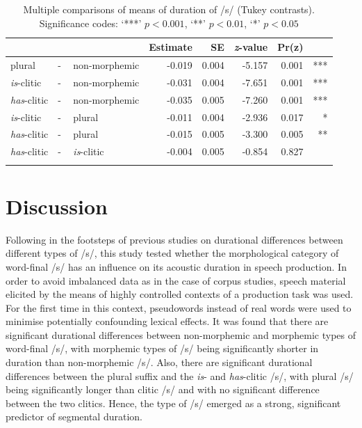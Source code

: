 \begin{table}\fontsize{10}{11}
\caption{Multiple comparisons of means of duration of /s/ (Tukey contrasts). Significance codes: `***' $p < 0.001$, `**' $p < 0.01$, `*' $p < 0.05$}
\label{tab:4.11}
\centering
\begin{tabular}{lllrrrrr} 
\lsptoprule
~                   & ~ & ~                  & Estimate & SE    & \textit{z}-value & Pr(\textbar{}z\textbar{}) & ~    \\ 
\midrule
plural              & - & non-morphemic      & -0.019   & 0.004 & -5.157           & 
  0.001                  & ***  \\
\textit{is}-clitic  & - & non-morphemic      & -0.031   & 0.004 & -7.651           &  0.001                    & ***  \\
\textit{has}-clitic & - & non-morphemic      & -0.035   & 0.005 & -7.260           & 
  0.001                  & ***  \\
\textit{is}-clitic  & - & plural             & -0.011   & 0.004 & -2.936           & 0.017                     & *    \\
\textit{has}-clitic & - & plural             & -0.015   & 0.005 & -3.300           & 0.005                     & **   \\
\textit{has}-clitic & - & \textit{is}-clitic & -0.004   & 0.005 & -0.854           & 0.827                     & ~    \\
\lspbottomrule
\end{tabular}
\end{table}



\section{Discussion}\label{section04_4}

Following in the footsteps of previous studies on durational differences between different types of /s/, this study tested whether the morphological category of word-final /s/ has an influence on its acoustic duration in speech production. In order to avoid imbalanced data as in the case of corpus studies, speech material elicited by the means of highly controlled contexts of a production task was used. For the first time in this context, pseudowords instead of real words were used to minimise potentially confounding lexical effects. It was found that there are significant durational differences between non-morphemic and morphemic types of word-final /s/, with morphemic types of /s/ being significantly shorter in duration than non-morphemic /s/. Also, there are significant durational differences between the plural suffix and the \textit{is}- and \textit{has}-clitic /s/, with plural /s/ being significantly longer than clitic /s/ and with no significant difference between the two clitics. Hence, the type of /s/ emerged as a strong, significant predictor of segmental duration.


